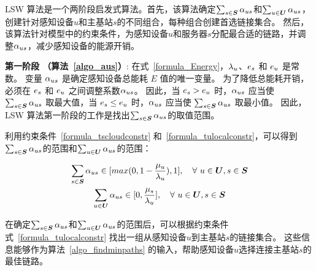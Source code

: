 LSW 算法是一个两阶段启发式算法。首先，该算法确定$\sum_{s \in \boldsymbol{S}}{\alpha}_{us}$和$\sum_{u \in \boldsymbol{U}}{\alpha}_{us}$，创建针对感知设备$u$和主基站$s$的不同组合，每种组合创建首选链接集合。
然后，该算法针对模型中的约束条件，为感知设备$u$和服务器$s$分配最合适的链路，并调整${\alpha}_{us}$，减少感知设备的能源开销。

\textbf{第一阶段 （算法~\ref{algo_aus}）}:
在式~\eqref{formula_Energy}，${\lambda}_{u}$、$e_s$ 和 $e_u$ 是常数。
变量 ${\alpha}_{us}$ 是确定感知设备总能耗 $E$ 值的唯一变量。
为了降低总能耗开销，必须在 $e_s$ 和 $e_u$ 之间调整系数${\alpha}_{us}$。
因此，当 $e_s > e_u$ 时，${\alpha}_{us}$ 应当使 $\sum_{s \in \boldsymbol{S}}{{\alpha}_{us}}$ 取最大值，当 $e_s \leq e_u$ 时，${\alpha}_{us}$ 应当使 $\sum_{s \in \boldsymbol{S}}{{\alpha}_{us}}$ 取最小值。
因此，LSW 算法第一阶段的工作是找出$\sum_{s \in \boldsymbol{S}}{\alpha}_{us}$的取值范围。

利用约束条件~\eqref{formula_tscloudconstr} 和~\eqref{formula_tulocalconstr}，可以得到$\sum_{s \in \boldsymbol{S}}{\alpha}_{us}$的范围和$\sum_{u \in \boldsymbol{U}}{\alpha}_{us}$的范围：

\vspace{-1em}

\begin{equation*}
\begin{gathered}
\sum_{s \in \boldsymbol{S}}{\alpha}_{us} \in [max(0, 1- \frac{{\mu}_{u}}{{\lambda}_{u}}), 1], \quad \forall\ u \in \boldsymbol{U}, s \in \boldsymbol{S}\\
\sum_{u \in \boldsymbol{U}}{\alpha}_{us} \in [0, \frac{{\mu}_{s}}{{\lambda}_{u}}], \quad \forall\ u \in \boldsymbol{U}, s \in \boldsymbol{S}
\end{gathered}
\end{equation*}

在确定$\sum_{s \in \boldsymbol{S}}{\alpha}_{us}$和$\sum_{u \in \boldsymbol{U}}{\alpha}_{us}$的范围后，可以根据约束条件式~\eqref{formula_tulocalconstr} 找出一组从感知设备$u$到主基站$s$的链接集合。
这些信息能够作为算法~\ref{algo_findminpaths} 的输入，帮助感知设备$u$选择连接主基站$s$的最佳链路。

